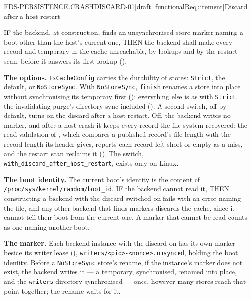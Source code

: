 \begin{requirement}{FDS-PERSISTENCE.CRASHDISCARD-01}[draft][functionalRequirement]{Discard after a host restart}


  IF the backend, at construction, finds an unsynchronised-store marker naming
  a boot other than the host's current one, THEN the backend shall make every
  record and temporary in the cache unreachable, by lookups and by the restart
  scan, before it answers its first lookup
  ().

  \textbf{The options.} \texttt{FsCacheConfig} carries the durability of
  stores: \texttt{Strict}, the default, or \texttt{NoStoreSync}. With
  \texttt{NoStoreSync}, \texttt{finish} renames a store into place without
  synchronising its temporary first ();
  everything else is as with \texttt{Strict}, the invalidating purge's
  directory sync included (). A second switch,
  off by default, turns on the discard after a host restart. Off, the
  backend writes no marker, and after a host crash it keeps every record the
  file system recovered: the read validation of
  , which compares a published record's
  file length with the record length its header gives, reports each record
  left short or empty as a miss, and the restart scan reclaims it
  (). The switch,
  \texttt{with\_discard\_after\_host\_restart}, exists only on Linux.

  \textbf{The boot identity.} The current boot's identity is the content of
  \texttt{/proc/sys/kernel/random/boot\_id}. IF the backend cannot read it,
  THEN constructing a backend with the discard switched on fails with an
  error naming the file, and any other backend that finds markers discards
  the cache, since it cannot tell their boot from the current one. A marker
  that cannot be read counts as one naming another boot.

  \textbf{The marker.} Each backend instance with the discard on has its own
  marker beside its writer lease (),
  \texttt{writers/\allowbreak<pid>-<nonce>.unsynced}, holding the boot identity. Before
  a \texttt{NoStoreSync} store's rename, if the instance's marker does not
  exist, the backend writes it --- a temporary, synchronised, renamed into
  place, and the \texttt{writers} directory synchronised --- once, however
  many stores reach that point together; the rename waits for it.


\end{requirement}
